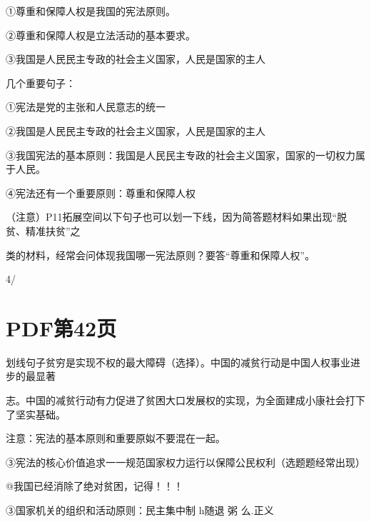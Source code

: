 \documentclass[lang=cn,11pt]{elegantbook}
\newcommand{\daofasym}[1]{{\daofasymbolfont #1}}
\newcommand{\daofasym}[1]{#1}
\begin{document}
\daofasym{①}尊重和保障人权是我国的宪法原则。\par

\daofasym{②}尊重和保障人权是立法活动的基本要求。\par

\daofasym{③}我国是人民民主专政的社会主义国家，人民是国家的主人\par

几个重要句子：\par

\daofasym{①}宪法是党的主张和人民意志的统一\par

\daofasym{②}我国是人民民主专政的社会主义国家，人民是国家的主人\par

\daofasym{③}我国宪法的基本原则：我国是人民民主专政的社会主义国家，国家的一切权力属于人民。\par

\daofasym{④}宪法还有一个重要原则：尊重和保障人权\par

（注意）P11拓展空间以下句子也可以划一下线，因为简答题材料如果出现“脱贫、精准扶贫”之\par

类的材料，经常会问体现我国哪一宪法原则？要答“尊重和保障人权”。\par

4/\par


\section*{PDF第42页}

划线句子贫穷是实现不权的最大障碍（选择）。中国的减贫行动是中国人权事业进步的最显著\par

志。中国的减贫行动有力促进了贫困大口发展权的实现，为全面建成小康社会打下了坚实基础。\par

注意：宪法的基本原则和重要原姒不要混在一起。\par

\daofasym{③}宪法的核心价值追求一一规范国家权力运行以保障公民权利（选题题经常出现）\par

@我国已经消除了绝对贫困，记得！！！\par

\daofasym{③}国家机关的组织和活动原则：民主集中制 h随退 粥 么.正义\par
\end{document}

